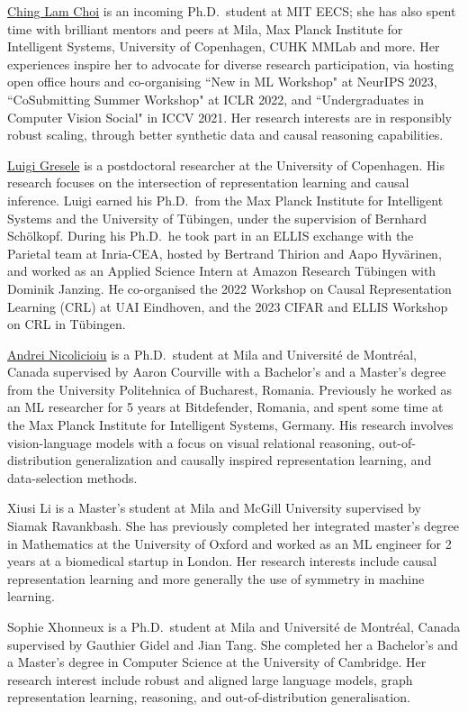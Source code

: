 \documentclass{article}
\begin{document}
\href{https://chinglamchoi.github.io/cchoi/}{Ching Lam Choi} is an incoming Ph.D.\ student at MIT EECS; she has also spent time with brilliant mentors and peers at Mila, Max Planck Institute for Intelligent Systems, University of Copenhagen, CUHK MMLab and more. Her experiences inspire her to advocate for diverse research participation, via hosting open office hours and co-organising ``New in ML Workshop" at NeurIPS 2023, ``CoSubmitting Summer Workshop" at ICLR 2022, and ``Undergraduates in Computer Vision Social" in ICCV 2021. Her research interests are in responsibly robust scaling, through better synthetic data and causal reasoning capabilities.

\href{https://lgresele.github.io/}{Luigi Gresele}  is a postdoctoral researcher at the University of Copenhagen. His research focuses on the intersection of representation learning and causal inference. Luigi earned his Ph.D.\ from the Max Planck Institute for Intelligent Systems and the University of Tübingen, under the supervision of Bernhard Schölkopf. During his Ph.D.\, he took part in an ELLIS exchange with the Parietal team at Inria-CEA, hosted by Bertrand Thirion and Aapo Hyvärinen, and worked as an Applied Science Intern at Amazon Research Tübingen with Dominik Janzing. He co-organised the 2022 Workshop on Causal Representation Learning (CRL) at UAI Eindhoven, and the 2023 CIFAR and ELLIS Workshop on CRL in T\"ubingen.

\href{https://andreinicolicioiu.github.io/}{Andrei Nicolicioiu} is a Ph.D.\ student at Mila and Universit\'{e} de Montr\'{e}al, Canada supervised by Aaron Courville with a Bachelor’s and a Master’s degree from the University Politehnica of Bucharest, Romania. Previously he worked as an ML researcher for 5 years at Bitdefender, Romania, and spent some time at the Max Planck Institute for Intelligent Systems, Germany. His research involves vision-language models with a focus on visual relational reasoning, out-of-distribution generalization and causally inspired representation learning, and data-selection methods.

Xiusi Li is a Master's student at Mila and McGill University supervised by Siamak Ravankbash. She has previously completed her integrated master's degree in Mathematics at the University of Oxford and worked as an ML engineer for 2 years at a biomedical startup in London. Her research interests include causal representation learning and more generally the use of symmetry in machine learning.

Sophie Xhonneux is a Ph.D.\ student at Mila and Universit\'{e} de Montr\'{e}al, Canada supervised by Gauthier Gidel and Jian Tang. She completed her a Bachelor's and a Master's degree in Computer Science at the University of Cambridge. Her research interest include robust and aligned large language models, graph representation learning, reasoning, and out-of-distribution generalisation.
\end{document}
